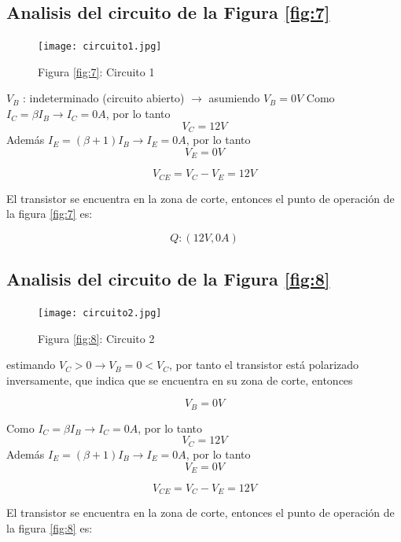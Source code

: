 \documentclass[10pt, a4paper]{article}
\begin{document}
    \subsection{Analisis del circuito de la Figura \ref{fig:7}}

    \begin{figure}[h!]
        \centering
        \texttt{[image: circuito1.jpg]} \par
        Figura \ref{fig:7}: Circuito 1 %
    \end{figure}

    $V_B$ : indeterminado (circuito abierto) $\rightarrow$ asumiendo $V_B = 0V$
    Como $I_C = \beta I_B \longrightarrow I_C = 0A$, por lo tanto
    $$V_C = 12V$$
    Además $I_E = (\beta + 1)I_B \longrightarrow I_E = 0A$, por lo tanto
    $$V_E = 0V$$

    $$V_{CE} = V_C - V_E = 12V$$

    El transistor se encuentra en la zona de corte, entonces el punto de operación de la figura \ref{fig:7} es:

    \begin{equation}
        Q : (12V, 0A)
        \label{Q1}
    \end{equation}

    \subsection{Analisis del circuito de la Figura \ref{fig:8}}

    \begin{figure}[h!]
        \centering
        \texttt{[image: circuito2.jpg]} \par
        Figura \ref{fig:8}: Circuito 2 %
    \end{figure}

    estimando $V_C > 0 \rightarrow V_B = 0 < V_C$, por tanto el transistor está polarizado inversamente, que indica que se encuentra en su zona de corte, entonces

    $$V_B = 0V$$

    Como $I_C = \beta I_B \longrightarrow I_C = 0A$, por lo tanto
    $$V_C = 12V$$
    Además $I_E = (\beta + 1)I_B \longrightarrow I_E = 0A$, por lo tanto
    $$V_E = 0V$$

    $$V_{CE} = V_C - V_E = 12V$$

    El transistor se encuentra en la zona de corte, entonces el punto de operación de la figura \ref{fig:8} es:
\end{document}
